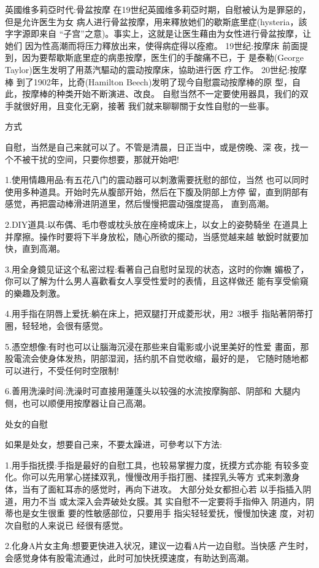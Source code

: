\documentclass[12pt,UTF8]{ctexbook}
\begin{document}
英國维多莉亞时代:骨盆按摩
在19世纪英國维多莉亞时期，自慰被认为是罪惡的，但是允许医生为女
病人进行骨盆按摩，用来釋放她们的歇斯底里症(hysteria，該字字源即来自
“子宫”之意)。事实上，这就是让医生藉由为女性进行骨盆按摩，让她们
因为性高潮而将压力釋放出来，使得病症得以痊癒。
19世纪:按摩床
前面提到，因为要帮歇斯底里症的病患按摩，医生们的手酸痛不已，于
是泰勒(George Taylor)医生发明了用蒸汽驅动的震动按摩床，協助进行医
疗工作。
20世纪:按摩棒
到了1902年，比奇(Hamilton Beech)发明了现今自慰震动按摩棒的原
型，自此，按摩棒的种类开始不断演进、改良。
自慰当然不一定要使用器具，我们的双手就很好用，且变化无窮，接著
我们就来聊聊關于女性自慰的一些事。

方式

自慰，当然是自己来就可以了。不管是清晨，日正当中，或是傍晚、深
夜，找一个不被干扰的空间，只要你想要，那就开始吧!

1.使用情趣用品:有五花八门的震动器可以刺激需要抚慰的部位，当然
也可以同时使用多种道具。开始时先从腹部开始，然后在下腹及阴部上方停
留，直到阴部有感觉，再把震动棒滑进阴道里，然后慢慢把震动强度提高，
直到高潮。

2.DIY道具:以布偶、毛巾卷或枕头放在座椅或床上，以女上的姿勢騎坐
在道具上并摩擦。操作时要将下半身放松，随心所欲的擺动，当感觉越来越
敏銳时就要加快，直到高潮。

3.用全身鏡见证这个私密过程:看著自己自慰时呈现的状态，这时的你嫵
媚极了，你可以了解为什么男人喜歡看女人享受性爱时的表情，且这样做还
能有享受偷窺的樂趣及刺激。

4.用手指在阴唇上爱抚:躺在床上，把双腿打开成菱形状，用2~3根手
指貼著阴蒂打圈，轻轻地，会很有感觉。

5.憑空想像:有时也可以让腦海沉浸在那些来自電影或小说里美好的性爱
畫面，那股電流会使身体发热，阴部湿润，括约肌不自觉收缩，最好的是，
它随时随地都可以进行，不受任何时空限制!

6.善用洗澡时间:洗澡时可直接用蓮蓬头以较强的水流按摩胸部、阴部和
大腿内侧，也可以顺便用按摩器让自己高潮。

处女的自慰

如果是处女，想要自己来，不要太躁进，可參考以下方法:

1.用手指抚摸:手指是最好的自慰工具，也较易掌握力度，抚摸方式亦能
有较多变化。你可以先用掌心搓揉双乳，慢慢改用手指打圈、揉捏乳头等方
式来刺激身体，当有了面紅耳赤的感觉时，再向下进攻。
大部分处女都担心若
以手指插入阴道，用力不当
或太深入会弄破处女膜。其
实自慰不一定要将手指伸入
阴道内，阴蒂也是女生很重
要的性敏感部位，只要用手
指尖轻轻爱抚，慢慢加快速
度，对初次自慰的人来说已
经很有感觉。

2.化身A片女主角:想要更快进入状况，建议一边看A片一边自慰。当快感
产生时，会感觉身体有股電流通过，此时可加快抚摸速度，有助达到高潮。
\end{document}
